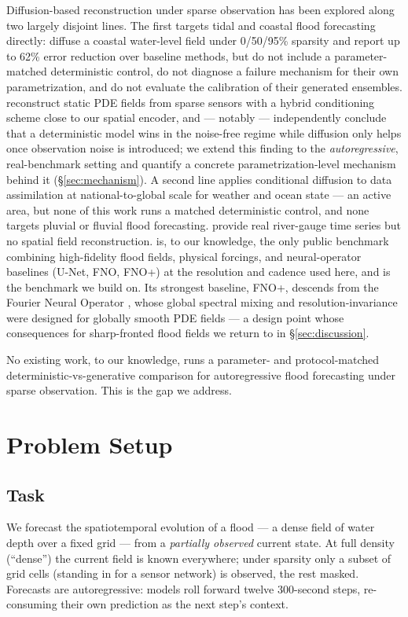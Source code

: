 \documentclass[11pt]{article}
\begin{document}
Diffusion-based reconstruction under sparse observation has been explored
along two largely disjoint lines. The first targets tidal and coastal
flood forecasting directly: \citet{diffsparse2025} diffuse a coastal
water-level field under 0/50/95\% sparsity and report up to 62\% error
reduction over baseline methods, but do not include a parameter-matched
deterministic control, do not diagnose a failure mechanism for their own
parametrization, and do not evaluate the calibration of their generated
ensembles. \citet{spatiallyawarediffusion2024} reconstruct static PDE
fields from sparse sensors with a hybrid conditioning scheme close to our
spatial encoder, and --- notably --- independently conclude that a
deterministic model wins in the noise-free regime while diffusion only
helps once observation noise is introduced; we extend this finding to the
\emph{autoregressive}, real-benchmark setting and quantify a concrete
parametrization-level mechanism behind it (\S\ref{sec:mechanism}). A second
line applies conditional diffusion to data assimilation at
national-to-global scale for weather and ocean state
\citep{jamesstations2025,jamesocean2025,phyda2025} --- an active area, but
none of this work runs a matched deterministic control, and none targets
pluvial or fluvial flood forecasting. \citet{sf2bench2025} provide real
river-gauge time series but no spatial field reconstruction.
\citet{floodcastbench2025} is, to our knowledge, the only public benchmark
combining high-fidelity flood fields, physical forcings, and
neural-operator baselines (U-Net, FNO, FNO+) at the resolution and cadence
used here, and is the benchmark we build on. Its strongest baseline, FNO+,
descends from the Fourier Neural Operator \citep{li2021fno}, whose global
spectral mixing and resolution-invariance were designed for globally
smooth PDE fields --- a design point whose consequences for sharp-fronted
flood fields we return to in \S\ref{sec:discussion}.

No existing work, to our knowledge, runs a parameter- and protocol-matched
deterministic-vs-generative comparison for autoregressive flood
forecasting under sparse observation. This is the gap we address.

\section{Problem Setup}
\label{sec:setup}

\subsection{Task}
We forecast the spatiotemporal evolution of a flood --- a dense field of
water depth over a fixed grid --- from a \emph{partially observed}
current state. At full density (``dense'') the current field is known
everywhere; under sparsity only a subset of grid cells (standing in for a
sensor network) is observed, the rest masked. Forecasts are
autoregressive: models roll forward twelve 300-second steps, re-consuming
their own prediction as the next step's context.
\end{document}
